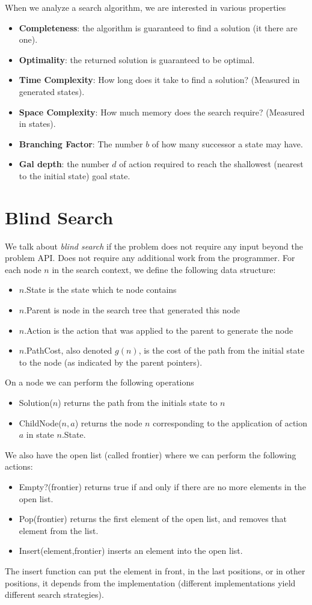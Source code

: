 \documentclass[10pt, letterpaper]{report}
\begin{document}
When we analyze a search algorithm, we are interested in various properties\begin{itemize}
    \item \textbf{Completeness}: the algorithm is guaranteed to find a solution (it there are one).
    \item \textbf{Optimality}: the returned solution is guaranteed to be optimal. 
    \item \textbf{Time Complexity}: How long does it take to find a solution? (Measured
in generated states).
    \item \textbf{Space Complexity}: How much memory does the search require?
(Measured in states).
    \item \textbf{Branching Factor}: The number $b$ of how many successor a state may have.
    \item \textbf{Gal depth}: the number $d$ of action required to reach the shallowest (nearest to the initial state) goal state.
\end{itemize}
\section{Blind Search}
We talk about \textit{blind search} if the problem does not require any input beyond the problem API. Does not require any additional work from the programmer. For each node $n$ in the search context, we define the following data structure:\begin{itemize}
    \item $n$.State is the state which te node contains 
    \item $n$.Parent is node in the search tree that generated this node
    \item $n$.Action is the action that was applied to the parent to generate the node
    \item $n$.PathCost, also denoted $g(n)$, is the cost of the path from the initial state to the node (as indicated by the parent pointers).
\end{itemize}
On a node we can perform the following operations\begin{itemize}
    \item Solution($n$) returns the path from the initials state to $n$
    \item ChildNode($n,a$) returns the node $n$ corresponding to the application of action $a$ in state $n$.State. 
\end{itemize}
We also have the open list (called frontier) where we can perform the following actions:\begin{itemize}
    \item Empty?(frontier) returns true if and only if there are no more elements in the
open list.
    \item Pop(frontier) returns the first element of the open list, and
removes that element from the list.
    \item Insert(element,frontier) inserts an element into the open list.
\end{itemize}
The insert function can put the element in front, in the last positions, or in other positions, it depends from the implementation (different implementations yield different search strategies).
\end{document}
